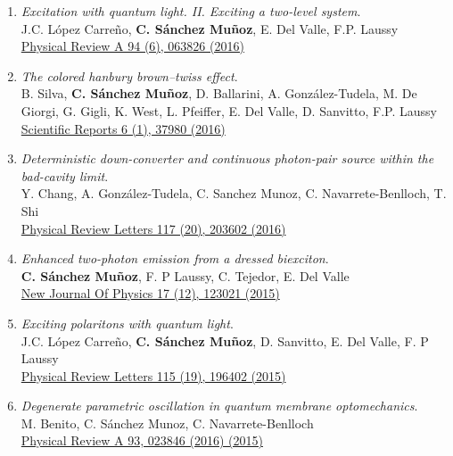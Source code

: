 \begin{enumerate}
 \item \emph{Excitation with quantum light. II. Exciting a two-level system}.\\ 
{J.C. López Carreño, \textbf{C. Sánchez Muñoz}, E. Del Valle, F.P. Laussy}\\ 
  \href{https://journals.aps.org/pra/abstract/10.1103/PhysRevA.94.063826}{{Physical Review A 94 (6), 063826 (2016)}}

 \item \emph{The colored hanbury brown–twiss effect}.\\ 
{B. Silva, \textbf{C. Sánchez Muñoz}, D. Ballarini, A. González-Tudela, M. De Giorgi, G. Gigli, K. West, L. Pfeiffer, E. Del Valle, D. Sanvitto, F.P. Laussy}\\ 
  \href{https://www.nature.com/articles/srep37980}{{Scientific Reports 6 (1), 37980 (2016)}}

 \item \emph{Deterministic down-converter and continuous photon-pair source within the bad-cavity limit}.\\ 
{Y. Chang, A. González-Tudela, C. Sanchez Munoz, C. Navarrete-Benlloch, T. Shi}\\ 
  \href{https://journals.aps.org/prl/abstract/10.1103/PhysRevLett.117.203602}{{Physical Review Letters 117 (20), 203602 (2016)}}

 \item \emph{Enhanced two-photon emission from a dressed biexciton}.\\ 
{\textbf{C. Sánchez Muñoz}, F. P Laussy, C. Tejedor, E. Del Valle}\\ 
  \href{https://iopscience.iop.org/article/10.1088/1367-2630/17/12/123021/meta}{{New Journal Of Physics 17 (12), 123021 (2015)}}

 \item \emph{Exciting polaritons with quantum light}.\\ 
{J.C. López Carreño, \textbf{C. Sánchez Muñoz}, D. Sanvitto, E. Del Valle, F. P Laussy}\\ 
  \href{https://journals.aps.org/prl/abstract/10.1103/PhysRevLett.115.196402}{{Physical Review Letters 115 (19), 196402 (2015)}}

 \item \emph{Degenerate parametric oscillation in quantum membrane optomechanics}.\\ 
{M. Benito, C. Sánchez Munoz, C. Navarrete-Benlloch}\\ 
  \href{https://journals.aps.org/pra/abstract/10.1103/PhysRevA.93.023846}{{Physical Review A 93, 023846 (2016) (2015)}}


\end{enumerate}
